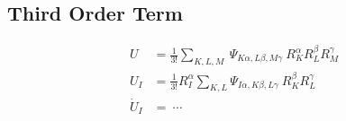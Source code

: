 \documentclass[nofootinbib,preprintnumbers,amsmath,amssymb,twocolumn]{revtex4-1}
\begin{document}
\subsection{Third Order Term}

\begin{align}
	U &= \frac{1}{3!} \sum_{K, L, M} ~ \Psi_{K \alpha, L \beta, M \gamma} 
	~ R_K^\alpha R_L^\beta R_M^\gamma \\
	U_I &=  \frac{1}{3!} R_I^\alpha \sum_{K, L} \Psi_{I \alpha, K \beta, L \gamma} 
	~ R_K^\beta R_L^\gamma \\
	\dot{U}_I &= ~ \cdots \nonumber
	\end{align}

\cleardoublepage






\end{document}
